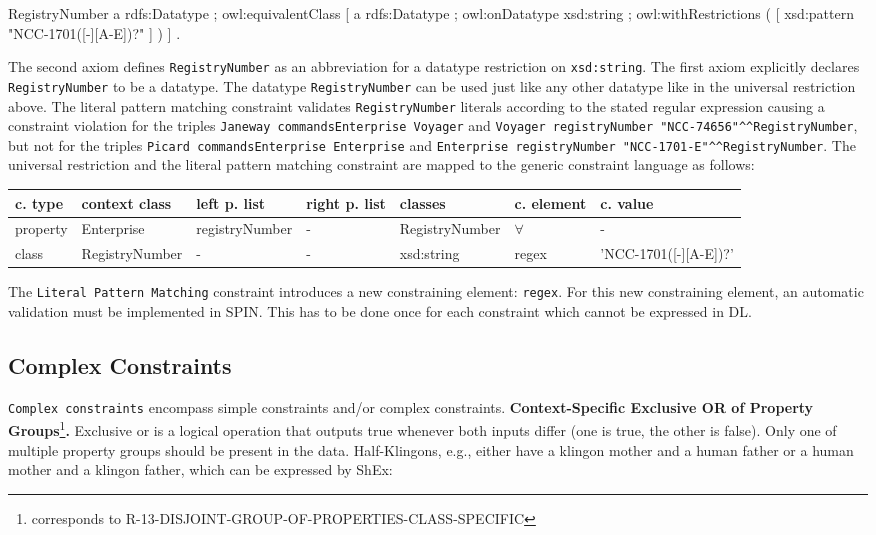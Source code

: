 \documentclass{llncs}
\newcommand{\ms}[1]{\texttt{#1}}
\newenvironment{gcotable}{
  \scriptsize
  \sffamily
  \vspace{0.3cm}
	\begin{center}
  \begin{tabular}{l|l|l|l|l|l|l}
  \hline
  \textbf{c. type} & \textbf{context class} & \textbf{left p. list} & \textbf{right p. list} & \textbf{classes} & \textbf{c. element} & \textbf{c. value} \\
  \hline

}{
  \hline
  \end{tabular}
	\end{center}
}
\begin{document}
\begin{ex}
RegistryNumber
    a rdfs:Datatype ;
    owl:equivalentClass [
        a rdfs:Datatype ;
        owl:onDatatype xsd:string ;
        owl:withRestrictions ( 
            [ xsd:pattern "NCC-1701([-][A-E])?" ] ) ] .
\end{ex}

The second axiom defines \ms{RegistryNumber} as an abbreviation for a datatype restriction on \ms{xsd:string}. 
The first axiom explicitly declares \ms{RegistryNumber} to be a datatype. 
The datatype \ms{RegistryNumber} can be used just like any other datatype like in the universal restriction above.
The literal pattern matching constraint validates \ms{RegistryNumber} literals according to the stated regular expression causing a constraint violation for the triples 
\ms{Janeway commandsEnterprise Voyager} and \ms{Voyager registryNumber "NCC-74656"\textasciicircum{}\textasciicircum{}RegistryNumber}, 
but not for the triples \ms{Picard commandsEnterprise Enterprise} and \ms{Enterprise registryNumber "NCC-1701-E"\textasciicircum{}\textasciicircum{}RegistryNumber}.
The universal restriction and the literal pattern matching constraint are mapped to the generic constraint language as follows:

\begin{gcotable}
property & Enterprise & registryNumber & - & RegistryNumber & $\forall$ & - \\
class & RegistryNumber & - & - & xsd:string & regex & 'NCC-1701([-][A-E])?' \\
\end{gcotable}

The \ms{Literal Pattern Matching} constraint introduces a new constraining element: \ms{regex}.
For this new constraining element, an automatic validation must be implemented in SPIN.
This has to be done once for each constraint which cannot be expressed in DL.

\subsection{Complex Constraints}

\ms{Complex constraints} encompass simple constraints and/or complex constraints.
\textbf{Context-Specific Exclusive OR of Property Groups}\footnote{corresponds to R-13-DISJOINT-GROUP-OF-PROPERTIES-CLASS-SPECIFIC}\textbf{.}
Exclusive or is a logical operation that outputs true whenever both inputs differ (one is true, the other is false).
Only one of multiple property groups should be present in the data.
Half-Klingons, e.g., either have a klingon mother and a human father or a human mother and a klingon father, which can be expressed by ShEx:
\end{document}
